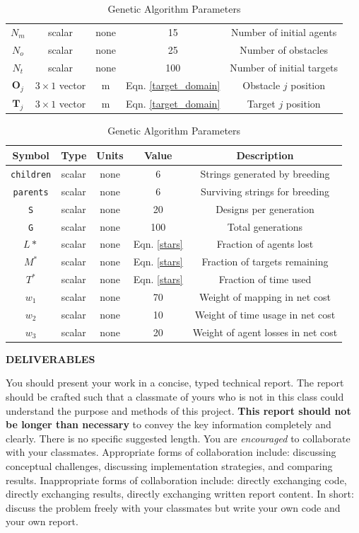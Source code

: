 \documentclass{article}
\begin{document}
\begin{table}[H]
\begin{center}
\begin{tabular}{||c|c|c|c|c||}
    $N_m$ & scalar & none & 15 & Number of initial agents \\
    $N_o$ & scalar & none & 25 & Number of obstacles\\
    $N_t$ & scalar & none & 100 & Number of initial targets\\
    $\boldsymbol{O}_j$ & $3 \times 1$ vector & m & Eqn. \ref{target_domain} & Obstacle $j$ position \\ 
    $\boldsymbol{T}_j$ & $3 \times 1$ vector & m & Eqn. \ref{target_domain} & Target $j$ position \\ 
    \hline
  \end{tabular}
  \vspace{0.5 cm}
  \caption{Genetic Algorithm Parameters}
  \quad
    \begin{tabular}{||c|c|c|c|c||}
    \hline
    Symbol & Type & Units & Value & Description \\
    \hline \hline
    {\tt children} & scalar & none & 6 & Strings generated by breeding \\
    {\tt parents} & scalar & none & 6 & Surviving strings for breeding \\
    {\tt S} & scalar & none & 20 & Designs per generation \\ 
    {\tt G} & scalar & none & 100 & Total generations \\ 
    $L*$ & scalar & none & Eqn. \ref{stars} & Fraction of agents lost\\
    $M^*$ & scalar & none & Eqn. \ref{stars} & Fraction of targets remaining\\
    $T^*$ & scalar & none & Eqn. \ref{stars} & Fraction of time used\\

    $w_1$ & scalar & none & 70 & Weight of mapping in net cost\\
    $w_2$ & scalar & none & 10 & Weight of time usage in net cost\\
    $w_3$ & scalar & none & 20 & Weight of agent losses in net cost\\
    \hline
  \end{tabular}
  \end{center}
  \end{table}
\newpage



 \centerline{ \bf DELIVERABLES}
 
 You should present your work in a concise, typed technical report. The report should be crafted such that a classmate of yours who is not in this class could understand the purpose and methods of this project. \textbf{This report should not be longer than necessary} to convey the key information completely and clearly. There is no specific suggested length. You are \emph{encouraged} to collaborate with your classmates. Appropriate forms of collaboration include: discussing conceptual challenges, discussing implementation strategies, and comparing results. Inappropriate forms of collaboration include: directly exchanging code, directly exchanging results, directly exchanging written report content. In short: discuss the problem freely with your classmates but write your own code and your own report.
 
\end{document}
